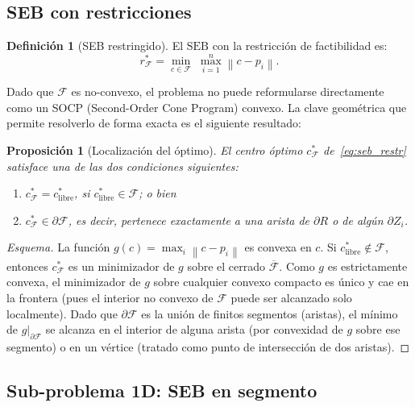 \documentclass[11pt,a4paper]{article}
\newtheorem{proposition}[theorem]{Proposición}
\theoremstyle{definition}
\newtheorem{definition}[theorem]{Definición}
\theoremstyle{remark}
\newcommand{\FF}{\mathcal{F}}
\newcommand{\seb}{\mathrm{SEB}}
\newcommand{\norm}[1]{\left\|#1\right\|}
\begin{document}
\subsection{SEB con restricciones}
\label{sec:seb_restringido}

\begin{definition}[SEB restringido]
El $\seb$ con la restricción de factibilidad es:
\begin{equation}
  r^*_\FF = \min_{c \in \FF}\; \max_{i=1}^n \norm{c - p_i}.
  \label{eq:seb_restr}
\end{equation}
\end{definition}

Dado que $\FF$ es no-convexo, el problema no puede reformularse directamente
como un SOCP (Second-Order Cone Program) convexo.  La clave geométrica que
permite resolverlo de forma exacta es el siguiente resultado:

\begin{proposition}[Localización del óptimo]
\label{prop:boundary}
El centro óptimo $c^*_\FF$ de~\eqref{eq:seb_restr} satisface una de las dos
condiciones siguientes:
\begin{enumerate}
  \item $c^*_\FF = c^*_\text{libre}$, si $c^*_\text{libre} \in \FF$; o bien
  \item $c^*_\FF \in \partial \FF$, es decir, pertenece exactamente a una
        arista de $\partial R$ o de algún $\partial Z_i$.
\end{enumerate}
\end{proposition}

\begin{proof}[Esquema]
La función $g(c) = \max_i \norm{c - p_i}$ es convexa en $c$.  Si
$c^*_\text{libre} \notin \FF$, entonces $c^*_\FF$ es un minimizador de $g$
sobre el cerrado $\overline{\FF}$.  Como $g$ es estrictamente convexa, el
minimizador de $g$ sobre cualquier convexo compacto es único y cae en la
frontera (pues el interior no convexo de $\FF$ puede ser alcanzado solo
localmente).  Dado que $\partial \FF$ es la unión de finitos segmentos
(aristas), el mínimo de $g|_{\partial\FF}$ se alcanza en el interior de
alguna arista (por convexidad de $g$ sobre ese segmento) o en un vértice
(tratado como punto de intersección de dos aristas).
\end{proof}

\subsection{Sub-problema 1D: SEB en segmento}
\label{sec:subproblem}
\end{document}

